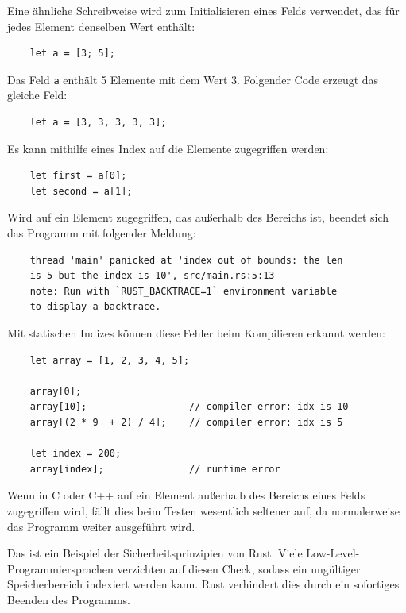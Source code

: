 Eine ähnliche Schreibweise wird zum Initialisieren eines Felds verwendet, das für jedes Ele\-ment denselben Wert enthält:

\begin{lstlisting}
    let a = [3; 5];
\end{lstlisting}

Das Feld \verb"a" enthält 5 Elemente mit dem Wert 3. Folgender Code erzeugt das gleiche Feld:

\begin{lstlisting}
    let a = [3, 3, 3, 3, 3];
\end{lstlisting}

Es kann mithilfe eines Index auf die Elemente zugegriffen werden:

\begin{lstlisting}
    let first = a[0];
    let second = a[1];
\end{lstlisting}

Wird auf ein Element zugegriffen, das außerhalb des Bereichs ist, beendet sich das Programm mit folgender Meldung:

\begin{lstlisting}
    thread 'main' panicked at 'index out of bounds: the len
    is 5 but the index is 10', src/main.rs:5:13
    note: Run with `RUST_BACKTRACE=1` environment variable
    to display a backtrace.
\end{lstlisting}

Mit statischen Indizes können diese Fehler beim Kompilieren erkannt werden:

\begin{lstlisting}
    let array = [1, 2, 3, 4, 5];

    array[0];
    array[10];                  // compiler error: idx is 10
    array[(2 * 9  + 2) / 4];    // compiler error: idx is 5

    let index = 200;
    array[index];               // runtime error
\end{lstlisting}

Wenn in C oder C++ auf ein Element außerhalb des Bereichs eines Felds zugegriffen wird, fällt dies beim Testen wesentlich seltener auf, da normalerweise das Programm weiter ausgeführt wird.

Das ist ein Beispiel der Sicherheitsprinzipien von Rust. Viele Low-Level-Pro\-gram\-mier\-spra\-chen verzichten auf diesen Check, sodass ein ungültiger Speicherbereich indexiert werden kann. Rust verhindert dies durch ein sofortiges Beenden des Programms.

